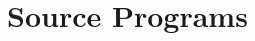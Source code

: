 \documentclass{article}
\begin{document}
\newpage
\section*{ Source Programs }

\newpage





\label{end}
\end{document}
